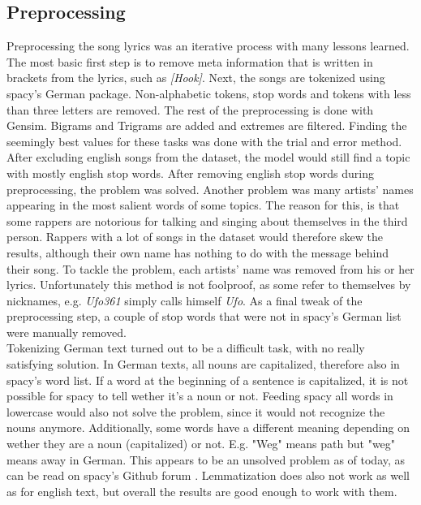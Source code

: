 \documentclass[conference]{IEEEtran}
\begin{document}
\subsection{Preprocessing} \label{preprocessing}
Preprocessing the song lyrics was an iterative process with many lessons learned. The most basic first step is to remove meta information that is written in brackets from the lyrics, such as \textit{[Hook]}. Next, the songs are tokenized using spacy's German package. Non-alphabetic tokens, stop words and tokens with less than three letters are removed. The rest of the preprocessing is done with Gensim. Bigrams and Trigrams are added and extremes are filtered. Finding the seemingly best values for these tasks was done with the trial and error method.\\
After excluding english songs from the dataset, the model would still find a topic with mostly english stop words. After removing english stop words during preprocessing, the problem was solved. Another problem was many artists' names appearing in the most salient words of some topics. The reason for this, is that some rappers are notorious for talking and singing about themselves in the third person. Rappers with a lot of songs in the dataset would therefore skew the results, although their own name has nothing to do with the message behind their song. To tackle the problem, each artists' name was removed from his or her lyrics. Unfortunately this method is not foolproof, as some refer to themselves by nicknames, e.g. \textit{Ufo361} simply calls himself \textit{Ufo}. As a final tweak of the preprocessing step, a couple of stop words that were not in spacy's German list were manually removed.\\
Tokenizing German text turned out to be a difficult task, with no really satisfying solution. In German texts, all nouns are capitalized, therefore also in spacy's word list. If a word at the beginning of a sentence is capitalized, it is not possible for spacy to tell wether it's a noun or not. Feeding spacy all words in lowercase would also not solve the problem, since it would not recognize the nouns anymore. Additionally, some words have a different meaning depending on wether they are a noun (capitalized) or not. E.g. "Weg" means path but "weg" means away in German. This appears to be an unsolved problem as of today, as can be read on spacy's Github forum \cite{spacy_issues}. Lemmatization does also not work as well as for english text, but overall the results are good enough to work with them.
\end{document}
